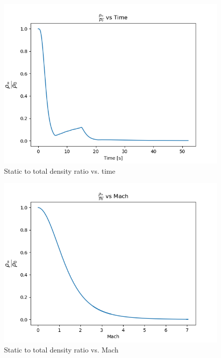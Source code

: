\documentclass[../main.tex]{subfiles}
\begin{document}
\begin{figure}[h!]
    \centering
    \includegraphics[scale=.7]{../../images/problem_1/rho_rho_t_vs_Time.png}
    \caption{Static to total density ratio vs. time}
    \label{rho_rho_t_time}
\end{figure}

\begin{figure}[h!]
    \centering
    \includegraphics[scale=.7]{../../images/problem_1/rho_rho_t_vs_Mach.png}
    \caption{Static to total density ratio vs. Mach}
    \label{rho_rho_t_vs_Mach}
\end{figure}
\end{document}
